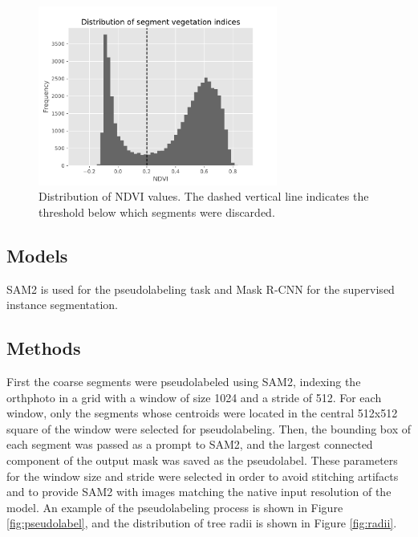 \documentclass[english, 12pt, a4paper, sci, utf8, a-2b, online]{aaltothesis}
\begin{document}
\begin{figure}[h]
    \centering
    \includegraphics[width=0.7\textwidth]{figures/ndvi.pdf}
    \caption{Distribution of NDVI values. The dashed vertical line indicates the threshold below which segments were discarded.}
    \label{fig:ndvi}
\end{figure}

\subsection{Models}

SAM2 is used for the pseudolabeling task and Mask R-CNN \cite{maskrcnn} for the supervised instance segmentation.

\subsection{Methods}

First the coarse segments were pseudolabeled using SAM2, indexing the orthphoto in a grid with a window of size 1024 and a stride of 512. For each window, only the segments whose centroids were located in the central 512x512 square of the window were selected for pseudolabeling. Then, the bounding box of each segment was passed as a prompt to SAM2, and the largest connected component of the output mask was saved as the pseudolabel. These parameters for the window size and stride were selected in order to avoid stitching artifacts and to provide SAM2 with images matching the native input resolution of the model. An example of the pseudolabeling process is shown in Figure \ref{fig:pseudolabel}, and the distribution of tree radii is shown in Figure \ref{fig:radii}.
\end{document}
